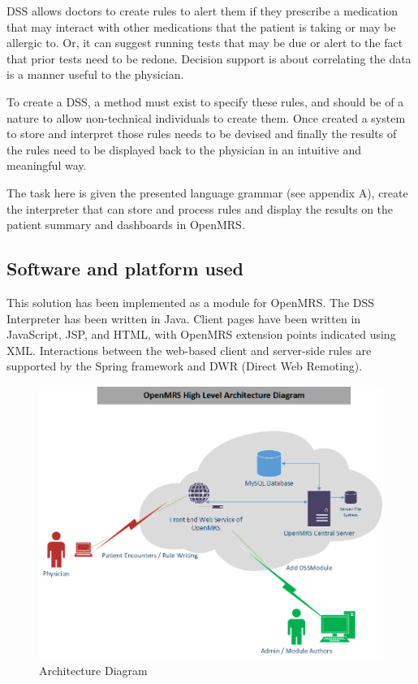 \documentclass[12pt,letterpaper]{article}
\begin{document}
DSS allows doctors to create rules to alert them if they prescribe a medication that may interact with other medications that the patient is taking or may be allergic to.   Or, it can suggest running tests that may be due or alert to the fact that prior tests need to be redone.  Decision support is about correlating the data is a manner useful to the physician.

To create a DSS, a method must exist to specify these rules, and should be of a nature to allow non-technical individuals to create them.  Once created a system to store and interpret those rules needs to be devised and finally the results of the rules need to be displayed back to the physician in an intuitive and meaningful way.

The task here is given the presented language grammar (see appendix A), create the interpreter that can store and process rules and display the results on the patient summary and dashboards in OpenMRS.

\subsection{Software and platform used}

This solution has been implemented as a module for OpenMRS. The DSS Interpreter has been written in Java. Client pages have been written 
in JavaScript, JSP, and HTML, with OpenMRS extension points indicated using 
XML. Interactions between the web-based client and server-side rules are 
supported by the Spring framework and DWR (Direct Web Remoting).

\begin{figure}\begin{center}
\includegraphics[width=6.5in]{OpenMRS_Architecture.png}
\end{center}
\caption{Architecture Diagram} \label{fig:ARCHITECTURE}
\end{figure}
\end{document}
